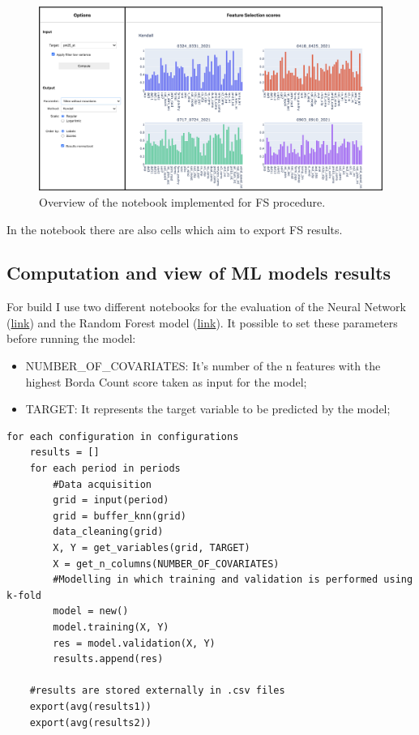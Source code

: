 \begin{figure}[H]
    \centering
    \includegraphics[scale=0.40]{images/notebook.png}
    \caption{Overview of the notebook implemented for FS procedure.}
    \label{fig:notebook}
\end{figure}

In the notebook there are also cells which aim to export FS results.

\subsection{Computation and view of ML models results}
For build I use two different notebooks for the evaluation of the Neural Network (\href{https://github.com/opengeolab/D-DUST/blob/thesis_MB/notebooks/Keras_prediction_model.ipynb}{link}) and the Random Forest model (\href{https://github.com/opengeolab/D-DUST/blob/thesis_MB/notebooks/RandomForest_prediction_model.ipynb}{link}). 
It possible to set these parameters before running the model:
\begin{itemize}
    \item NUMBER\_OF\_COVARIATES: It's number of the n features with the highest Borda Count score taken as input for the model;
    \item TARGET: It represents the target variable to be predicted by the model;
\end{itemize}
\begin{verbatim}
for each configuration in configurations
    results = []
    for each period in periods
        #Data acquisition
        grid = input(period)
        grid = buffer_knn(grid)
        data_cleaning(grid)
        X, Y = get_variables(grid, TARGET)
        X = get_n_columns(NUMBER_OF_COVARIATES)
        #Modelling in which training and validation is performed using k-fold
        model = new()
        model.training(X, Y)
        res = model.validation(X, Y)
        results.append(res)
    
    #results are stored externally in .csv files
    export(avg(results1))
    export(avg(results2))
 
\end{verbatim}

